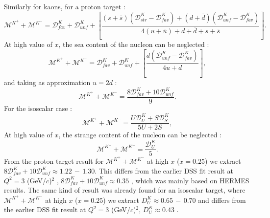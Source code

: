 Similarly for kaons, for a proton target :
%
\begin{equation}
  \mathscr{M}^{K^+}+\mathscr{M}^{K^-} = \mathscr{D}^K_{fav}+\mathscr{D}^K_{unf}+\left[\frac{(s+\bar{s})\left( \mathscr{D}^K_{str}-\mathscr{D}^K_{fav} \right) + (d+\bar{d})\left( \mathscr{D}^K_{unf}-\mathscr{D}^K_{fav} \right)}{4(u+\bar{u}) + d + \bar{d} + s + \bar{s}} \right].
\end{equation}
%
At high value of $x$, the sea content of the nucleon can be neglected :
%
\begin{equation}
  \mathscr{M}^{K^+}+\mathscr{M}^{K^-} = \mathscr{D}^K_{fav}+\mathscr{D}^K_{unf}+\left[\frac{d\left( \mathscr{D}^K_{unf}-\mathscr{D}^K_{fav} \right)}{4u + d} \right],
\end{equation}
%
and taking as approximation $u=2d$ :
%
\begin{equation}
  \mathscr{M}^{K^+}+\mathscr{M}^{K^-} = \frac{8\mathscr{D}^K_{fav}+10\mathscr{D}^K_{unf}}{9}.
\end{equation}
%
For the isoscalar case :
%
\begin{equation}\label{eq:ksum}
  \mathscr{M}^{K^+}+\mathscr{M}^{K^-} = \frac{U\mathscr{D}^K_U+S\mathscr{D}^K_S}{5U+2S},
\end{equation}
%
At high value of $x$, the strange content of the nucleon can be neglected :
%
\begin{equation}\label{eq:ksum}
  \mathscr{M}^{K^+}+\mathscr{M}^{K^-} = \frac{\mathscr{D}^K_U}{5}.
\end{equation}
%
From the proton target result for $\mathscr{M}^{K^+}+\mathscr{M}^{K^-}$ at high $x$ ($x = 0.25$) we extract $8\mathscr{D}^K_{fav}+10\mathscr{D}^K_{unf} \approx 1.22\,-\,1.30$. This differs from the earlier DSS fit result at $Q^2 = 3$ (GeV/$c$)$^2$ , $8\mathscr{D}^K_{fav}+10\mathscr{D}^K_{unf} \approx 0.35$ \cite{DSS07}, which was mainly based on HERMES results. The same kind of result was already found for an isoscalar target, where $\mathscr{M}^{K^+}+\mathscr{M}^{K^-}$ at high $x$ ($x = 0.25$) we extract $D_U^K \approx 0.65\,-\,0.70$ and differs from the earlier DSS fit result at $Q^2 = 3$ (GeV/$c$)$^2$, $D_U^K \approx 0.43$ \cite{DSS07}.

